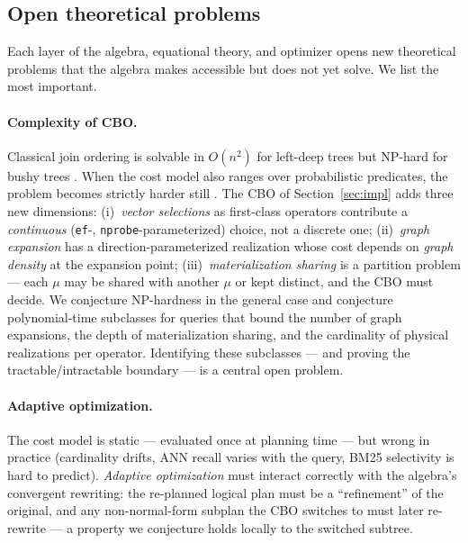 \documentclass[acmsmall,review,anonymous]{acmart}
\theoremstyle{plain}
\theoremstyle{definition}
\theoremstyle{remark}
\begin{document}
\subsection{Open theoretical problems}\label{sec:open}

Each layer of the algebra, equational theory, and optimizer opens
new theoretical problems that the algebra makes accessible but does
not yet solve. We list the most important.

\paragraph{Complexity of CBO.}\label{sec:open:complexity}
Classical join ordering is solvable in $O(n^2)$ for left-deep trees
\cite{selinger1979} but NP-hard for bushy trees
\cite{ibarakikameda1984,pellenkoft1996}. When the cost model
also ranges over probabilistic predicates, the problem becomes
strictly harder still \cite{dalvi2007}. The CBO of
Section~\ref{sec:impl} adds three new dimensions:
(i)~\emph{vector selections} as first-class operators contribute a
\emph{continuous} (\texttt{ef}-, \texttt{nprobe}-parameterized)
choice, not a discrete one; (ii)~\emph{graph expansion} has a
direction-parameterized realization whose cost depends on
\emph{graph density} at the expansion point; (iii)~\emph{materialization
sharing} is a partition problem --- each $\mu$ may be shared with
another $\mu$ or kept distinct, and the CBO must decide. We
conjecture NP-hardness in the general case and conjecture
polynomial-time subclasses for queries that bound the number of
graph expansions, the depth of materialization sharing, and the
cardinality of physical realizations per operator. Identifying
these subclasses --- and proving the tractable/intractable
boundary --- is a central open problem.

\paragraph{Adaptive optimization.}
The cost model is static --- evaluated once at planning time ---
but wrong in practice (cardinality drifts, ANN recall varies with
the query, BM25 selectivity is hard to predict). \emph{Adaptive
optimization} \cite{graefe1994} must interact correctly with the
algebra's convergent rewriting: the re-planned logical plan must be
a ``refinement'' of the original, and any non-normal-form subplan
the CBO switches to must later re-rewrite --- a property we
conjecture holds locally to the switched subtree.
\end{document}
